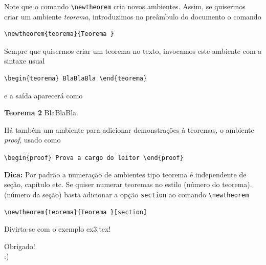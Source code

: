 \documentclass[12pt]{beamer}
\begin{document}
\begin{frame}[fragile]
  Note que o comando \verb+\newtheorem+ cria novos ambientes. Assim, se quisermos criar um ambiente \textit{teorema}, introduzimos no preâmbulo do documento o comando

  \begin{verbatim}
\newtheorem{teorema}{Teorema }
  \end{verbatim}
  Sempre que quisermos criar um teorema no texto, invocamos este ambiente com a sintaxe usual

  \begin{verbatim}
\begin{teorema} BlaBlaBla \end{teorema}
  \end{verbatim}
  e a saída aparecerá como

  \bigskip
  \textbf{Teorema 2} BlaBlaBla.

\end{frame}

\begin{frame}[fragile]
  Há também um ambiente para adicionar demonstrações à teoremas, o ambiente \textit{proof}, usado como

  \verb+\begin{proof} Prova a cargo do leitor \end{proof}+

  \bigskip

  \textbf{Dica: } Por padrão a numeração de ambientes tipo teorema é independente de seção, capítulo etc. Se quiser numerar teoremas no estilo (número do teorema).(número da seção) basta adicionar a opção \verb+section+ ao comando \verb+\newtheorem+

  \begin{verbatim}
\newtheorem{teorema}{Teorema }[section]
  \end{verbatim}

  Divirta-se com o exemplo ex3.tex!

\end{frame}

\begin{frame}
  \begin{center}
    \large Obrigado!\\
    :)
  \end{center}
\end{frame}
\end{document}
